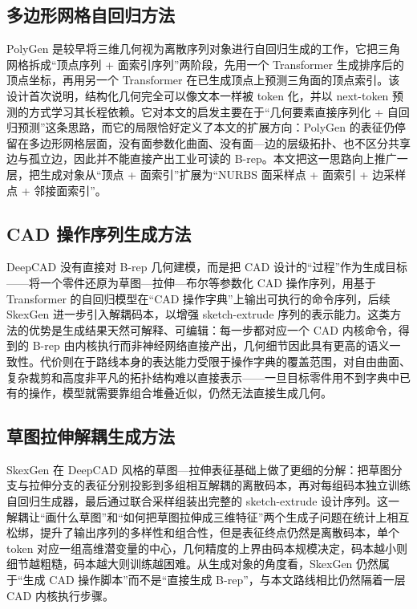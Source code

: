 \subsection{多边形网格自回归方法}

PolyGen\cite{nash_2020_polygen} 是较早将三维几何视为离散序列对象进行自回归生成的工作，它把三角网格拆成“顶点序列 + 面索引序列”两阶段，先用一个 Transformer 生成排序后的顶点坐标，再用另一个 Transformer 在已生成顶点上预测三角面的顶点索引。该设计首次说明，结构化几何完全可以像文本一样被 token 化，并以 next-token 预测的方式学习其长程依赖。它对本文的启发主要在于“几何要素直接序列化 + 自回归预测”这条思路，而它的局限恰好定义了本文的扩展方向：PolyGen 的表征仍停留在多边形网格层面，没有面参数化曲面、没有面—边的层级拓扑、也不区分共享边与孤立边，因此并不能直接产出工业可读的 B-rep。本文把这一思路向上推广一层，把生成对象从“顶点 + 面索引”扩展为“NURBS 面采样点 + 面索引 + 边采样点 + 邻接面索引”。

\subsection{CAD 操作序列生成方法}

DeepCAD\cite{wu_2021_deepcad} 没有直接对 B-rep 几何建模，而是把 CAD 设计的“过程”作为生成目标——将一个零件还原为草图—拉伸—布尔等参数化 CAD 操作序列，用基于 Transformer 的自回归模型在“CAD 操作字典”上输出可执行的命令序列，后续 SkexGen 进一步引入解耦码本，以增强 sketch-extrude 序列的表示能力\cite{pmlr-v162-xu22k}。这类方法的优势是生成结果天然可解释、可编辑：每一步都对应一个 CAD 内核命令，得到的 B-rep 由内核执行而非神经网络直接产出，几何细节因此具有更高的语义一致性。代价则在于路线本身的表达能力受限于操作字典的覆盖范围，对自由曲面、复杂裁剪和高度非平凡的拓扑结构难以直接表示——一旦目标零件用不到字典中已有的操作，模型就需要靠组合堆叠近似，仍然无法直接生成几何。

\subsection{草图拉伸解耦生成方法}

SkexGen 在 DeepCAD 风格的草图—拉伸表征基础上做了更细的分解：把草图分支与拉伸分支的表征分别投影到多组相互解耦的离散码本，再对每组码本独立训练自回归生成器，最后通过联合采样组装出完整的 sketch-extrude 设计序列。这一解耦让“画什么草图”和“如何把草图拉伸成三维特征”两个生成子问题在统计上相互松绑，提升了输出序列的多样性和组合性，但是表征终点仍然是离散码本，单个 token 对应一组高维潜变量的中心，几何精度的上界由码本规模决定，码本越小则细节越粗糙，码本越大则训练越困难。从生成对象的角度看，SkexGen 仍然属于“生成 CAD 操作脚本”而不是“直接生成 B-rep”，与本文路线相比仍然隔着一层 CAD 内核执行步骤。

